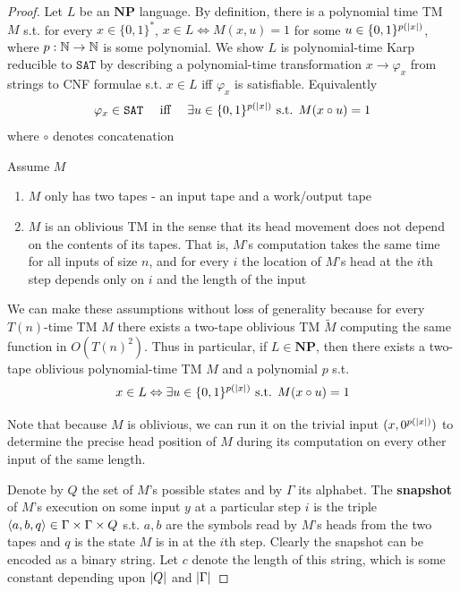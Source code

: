 \documentclass[11pt]{article}
\def \NP {\textbf{NP}}
\def \NP {\textbf{NP}}
\def \SAT {\texttt{SAT}}
\begin{document}
\begin{proof}
Let \(L\) be an \(\NP\) language. By definition, there is a polynomial time TM \(M\) s.t. for
every \(x\in\{0,1\}^*\), \(x\in L\Leftrightarrow M(x,u)=1\) for
some \(u\in\{0,1\}^{p(\abs{x})}\), where \(p:\mathbb{N}\to\mathbb{N}\) is some polynomial. We show \(L\) is
polynomial-time Karp reducible to \(\SAT\) by describing a polynomial-time
transformation \(x\to\varphi_x\) from strings to CNF formulae s.t. \(x\in L\) iff \(\varphi_x\)
is satisfiable. Equivalently
     \begin{equation*}
\varphi_x\in\SAT \quad\text{ iff }\quad\exists u\in\{0,1\}^{p(\abs{x})}
\text{ s.t. }M(x\circ u)=1
     \end{equation*}
where \(\circ\) denotes concatenation

Assume \(M\)
\begin{enumerate}
\item \(M\) only has two tapes - an input tape and a work/output tape
\item \(M\) is an oblivious TM in the sense that its head movement does not depend on the contents
of its tapes. That is, \(M\)'s computation takes the same time for all inputs of size \(n\),
and for every \(i\) the location of \(M\)'s head at the \(i\)th step depends only on \(i\)
and the length of the input
\end{enumerate}


We can make these assumptions without loss of generality because for every \(T(n)\)-time TM \(M\)
there exists a two-tape oblivious TM \(\tilde{M}\) computing the same function
in \(O(T(n)^2)\). Thus in particular, if \(L\in\NP\), then there exists a two-tape oblivious
polynomial-time TM \(M\) and a polynomial \(p\) s.t.
     \begin{equation}
     \label{eq:2.2}
x\in L \Leftrightarrow \exists u\in\{0,1\}^{p(\abs{x})}\text{ s.t. }M(x\circ u)=1
     \end{equation}

Note that because \(M\) is oblivious, we can run it on the trivial input \((x,0^{p(\abs{x})})\)
to determine the precise head position of \(M\) during its computation on every other input of
the same length.

Denote by \(Q\) the set of \(M\)'s possible states and by \(\Gamma\) its alphabet. The \textbf{snapshot}
of \(M\)'s execution on some input \(y\) at a particular step \(i\) is the triple
\(\langle a,b,q\rangle\in\Gamma\times\Gamma\times Q\) s.t. \(a,b\) are the symbols read by \(M\)'s
heads from the two tapes and \(q\) is the state \(M\) is in at the \(i\)th step. Clearly the
snapshot can be encoded as a binary string. Let \(c\) denote the length of this string, which
is some constant depending upon \(\abs{Q}\) and \(\abs{\Gamma}\)


\end{proof}
\end{document}
